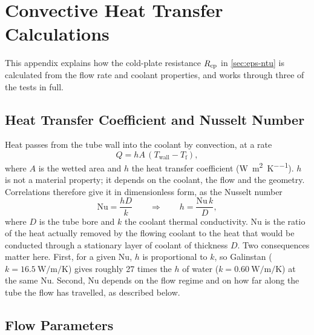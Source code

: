 \chapter{Convective Heat Transfer Calculations}
\label{app:convection}

This appendix explains how the cold-plate resistance $R_{\mathrm{cp}}$ in
\cref{sec:eps-ntu} is calculated from the flow rate and coolant properties, and
works through three of the tests in full.

\section{Heat Transfer Coefficient and Nusselt Number}

Heat passes from the tube wall into the coolant by convection, at a rate
\begin{equation}
  Q = hA\,(T_{\mathrm{wall}} - T_{\mathrm{f}}),
\end{equation}
where $A$ is the wetted area and $h$ the heat transfer coefficient
(\si{\watt\per\metre\squared\per\kelvin}). $h$ is not a material property; it
depends on the coolant, the flow and the geometry. Correlations therefore give
it in dimensionless form, as the Nusselt number
\begin{equation}
  \mathrm{Nu} = \frac{hD}{k}
  \qquad\Longrightarrow\qquad
  h = \frac{\mathrm{Nu}\,k}{D},
  \label{eq:app-nu}
\end{equation}
where $D$ is the tube bore and $k$ the coolant thermal conductivity. Nu is the
ratio of the heat actually removed by the flowing coolant to the heat that would
be conducted through a stationary layer of coolant of thickness $D$. Two
consequences matter here. First, for a given Nu, $h$ is proportional to $k$, so
Galinstan ($k = \SI{16.5}{\watt\per\metre\per\kelvin}$) gives roughly 27 times
the $h$ of water ($k = \SI{0.60}{\watt\per\metre\per\kelvin}$) at the same Nu.
Second, Nu depends on the flow regime and on how far along the tube the flow
has travelled, as described below.

\section{Flow Parameters}

